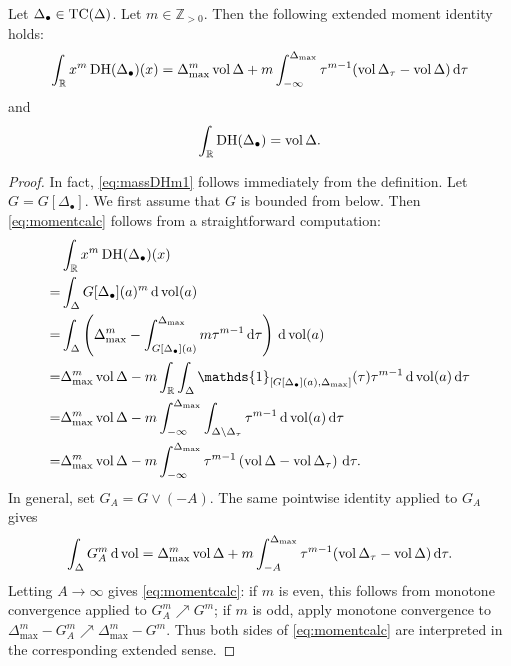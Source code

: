 \begin{proposition}\label{prop:DHmoments}
    Let $\Delta_{\bullet}\in \mathrm{TC}(\Delta)$. Let $m\in \mathbb{Z}_{>0}$. Then the following extended moment identity holds:
    \begin{equation}\label{eq:momentcalc}
\int_{\mathbb{R}}x^m \operatorname{DH}(\Delta_{\bullet})(x)=\Delta_{\max}^m\operatorname{vol}\Delta+m\int_{-\infty}^{\Delta_{\max}} \tau^{m-1}(\operatorname{vol} \Delta_{\tau}-\operatorname{vol} \Delta)\,\mathrm{d}\tau
    \end{equation}
and
\begin{equation}\label{eq:massDHm1}
\int_{\mathbb{R}}\operatorname{DH}(\Delta_{\bullet})=\operatorname{vol} \Delta.
\end{equation}
\end{proposition}
\begin{proof}
In fact, \eqref{eq:massDHm1} follows immediately from the definition. Let $G=G[\Delta_{\bullet}]$. We first assume that $G$ is bounded from below. Then \eqref{eq:momentcalc} follows from a straightforward computation:
\[
\begin{aligned}
    &\int_{\mathbb{R}}x^m \DHm(\Delta_{\bullet})(x)\\
    =& \int_{\Delta} G[\Delta_{\bullet}](a)^m\,\mathrm{d}\vol(a)\\
    =& \int_{\Delta} \left( \Delta_{\max}^m-\int_{G[\Delta_{\bullet}](a)}^{\Delta_{\max}} m\tau^{m-1}\,\mathrm{d}\tau\right)\,\mathrm{d}\vol(a)\\
    =& \Delta_{\max}^m\vol \Delta-m\int_{\mathbb{R}}\int_{\Delta} \mathds{1}_{[G[\Delta_{\bullet}](a),\Delta_{\max}]}(\tau)\tau^{m-1}\,\mathrm{d}\vol(a)\,\mathrm{d}\tau\\
    =& \Delta_{\max}^m\vol \Delta-m\int_{-\infty}^{\Delta_{\max}}\int_{\Delta\setminus \Delta_{\tau}} \tau^{m-1}\,\mathrm{d}\vol(a)\,\mathrm{d}\tau\\
    =& \Delta_{\max}^m\vol \Delta-m\int_{-\infty}^{\Delta_{\max}} \tau^{m-1}\left(\vol \Delta-\vol \Delta_{\tau}\right)\,\mathrm{d}\tau.
\end{aligned}
\]
In general, set $G_A=G\lor (-A)$. The same pointwise identity applied to $G_A$ gives
\[
\int_{\Delta}G_A^m\,\mathrm{d}\operatorname{vol}=\Delta_{\max}^m\operatorname{vol}\Delta
+m\int_{-A}^{\Delta_{\max}}\tau^{m-1}(\operatorname{vol} \Delta_{\tau}-\operatorname{vol}\Delta)\,\mathrm{d}\tau.
\]
Letting $A\to\infty$ gives \eqref{eq:momentcalc}: if $m$ is even, this follows from monotone convergence applied to $G_A^m\nearrow G^m$; if $m$ is odd, apply monotone convergence to $\Delta_{\max}^m-G_A^m\nearrow \Delta_{\max}^m-G^m$. Thus both sides of \eqref{eq:momentcalc} are interpreted in the corresponding extended sense.
\end{proof}


